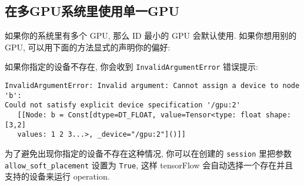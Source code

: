 \subsection{在多GPU系统里使用单一GPU}\label{ux5728ux591agpuux7cfbux7edfux91ccux4f7fux7528ux5355ux4e00gpu}

如果你的系统里有多个 GPU, 那么 ID 最小的 GPU 会默认使用. 如果你想用别的
GPU, 可以用下面的方法显式的声明你的偏好:

\begin{Shaded}
\begin{Highlighting}[]
 \NormalTok{):}
  \OperatorTok{=} \NormalTok{tf.constant([}\NormalTok{, }\NormalTok{, }\NormalTok{, }\NormalTok{, }\NormalTok{, }\NormalTok{], shape}\OperatorTok{=}\NormalTok{[}\NormalTok{, }\NormalTok{], name}\OperatorTok{=}\NormalTok{)}
  \OperatorTok{=} \NormalTok{tf.constant([}\NormalTok{, }\NormalTok{, }\NormalTok{, }\NormalTok{, }\NormalTok{, }\NormalTok{], shape}\OperatorTok{=}\NormalTok{[}\NormalTok{, }\NormalTok{], name}\OperatorTok{=}\NormalTok{)}
  \OperatorTok{=} 
\OperatorTok{=} \OperatorTok{=}\OperatorTok{=}\NormalTok{))}
 
\end{Highlighting}
\end{Shaded}

如果你指定的设备不存在, 你会收到 \texttt{InvalidArgumentError} 错误提示:

\begin{verbatim}
InvalidArgumentError: Invalid argument: Cannot assign a device to node 'b':
Could not satisfy explicit device specification '/gpu:2'
   [[Node: b = Const[dtype=DT_FLOAT, value=Tensor<type: float shape: [3,2]
   values: 1 2 3...>, _device="/gpu:2"]()]]
\end{verbatim}

为了避免出现你指定的设备不存在这种情况, 你可以在创建的 \texttt{session}
里把参数 \texttt{allow\_soft\_placement} 设置为 \texttt{True}, 这样
tensorFlow 会自动选择一个存在并且支持的设备来运行 operation.

